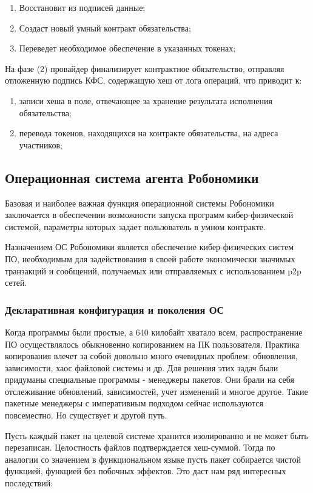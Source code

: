 \documentclass{article}
\begin{document}
\begin{enumerate}
	\item Восстановит из подписей данные;
	\item Создаст новый умный контракт обязательства;
	\item Переведет необходимое обеспечение в указанных токенах;
\end{enumerate}

На фазе (2) провайдер финализирует контрактное обязательство, отправляя отложенную подпись КФС, содержащую хеш от лога операций, что приводит к:
\begin{enumerate}
	\item записи хеша в поле, отвечающее за хранение результата исполнения обязательства;
	\item перевода токенов, находящихся на контракте обязательства, на адреса участников; 
\end{enumerate}

\subsection{Операционная система агента Робономики}

Базовая и наиболее важная функция операционной системы Робономики заключается в обеспечении возможности запуска программ кибер-физической системой, параметры которых задает пользователь в умном контракте.

Назначением ОС Робономики является обеспечение кибер-физических систем ПО, необходимым для задействования в своей работе экономически значимых транзакций и сообщений, получаемых или отправляемых с использованием p2p сетей.

\subsubsection{Декларативная конфигурация и поколения ОС}
Когда программы были простые, а 640 килобайт хватало всем, распространение ПО осуществлялось обыкновенно копированием на ПК пользователя. Практика копирования влечет за собой довольно много очевидных проблем: обновления, зависимости, хаос файловой системы и др. Для решения этих задач были придуманы специальные программы - менеджеры пакетов. Они брали на себя отслеживание обновлений, зависимостей, учет изменений и многое другое. Такие пакетные менеджеры с императивным подходом сейчас используются повсеместно. Но существует и другой путь.

Пусть каждый пакет на целевой системе хранится изолированно и не может быть перезаписан. Целостность файлов подтверждается хеш-суммой. Тогда по аналогии со  значением в функциональном языке пусть пакет собирается чистой функцией, функцией без побочных эффектов. Это даст нам ряд интересных последствий:
\end{document}
